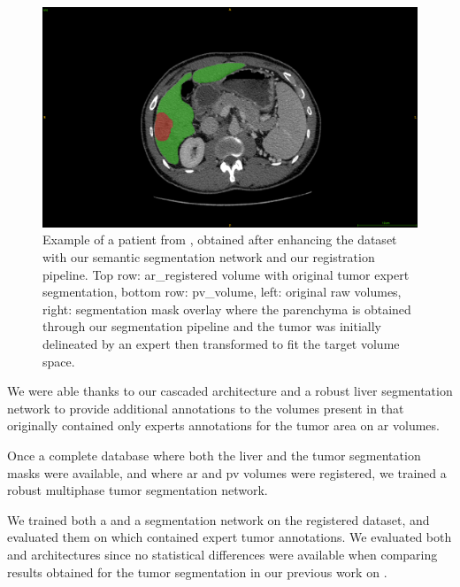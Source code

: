 \begin{figure}[ht!]
\begin{minipage}{0.45\linewidth}
	\end{minipage} \hspace{-0.1cm}
	\begin{minipage}{0.45\linewidth}
	\includegraphics[width=\linewidth]{../HistologicalGradePrediction/images/GDB/GDB_Pat77_slice261_PV_liverTumorPred}
	\end{minipage}
	\caption{Example of a patient from \textbf{}, obtained after enhancing the dataset with our semantic segmentation network and our registration pipeline. Top row: \ac{ar}\_registered volume with original tumor expert segmentation, bottom row: \ac{pv}\_volume, left: original raw volumes, right: segmentation mask overlay where the parenchyma is obtained through our segmentation pipeline and the tumor was initially delineated by an expert then transformed to fit the target volume space.}
	\label{fig:gDbRegisteredPatient}
\end{figure}


We were able thanks to our cascaded architecture and a robust liver
segmentation network to provide additional annotations to the volumes present in \textbf{} that
originally contained only experts annotations for the tumor area on \ac{ar} volumes.

Once a complete database where both the liver and the tumor segmentation
masks were available, and where \ac{ar} and \ac{pv} volumes were registered, we
trained a robust multiphase tumor segmentation network.

We trained both a  and a  segmentation network on the
registered \textbf{} dataset, and evaluated them on  which
contained expert tumor annotations. We evaluated both  and 
architectures since no statistical differences were available when
comparing results obtained for the tumor segmentation in our previous
work on \textbf{} \cite{Ouhmich2019}.

